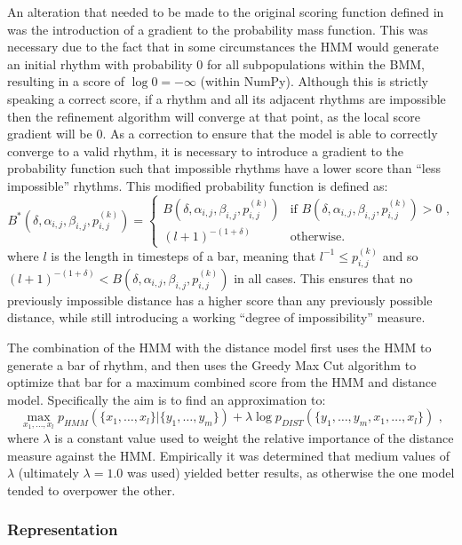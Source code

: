 \documentclass[ author={Stephen Livermore-Tozer},
				supervisor={Dr. Peter Flach},
				degree={MEng},
				title={Algorithmic Co-composition Using Machine Learning},
				subtitle={},
				type={research},
				year={2016} ]{dissertation}
\begin{document}
	An alteration that needed to be made to the original scoring function defined in \cite{paiement2007generative} was the introduction of a gradient to the probability mass function. This was necessary due to the fact that in some circumstances the HMM would generate an initial rhythm with probability $0$ for all subpopulations within the BMM, resulting in a score of $\log 0 = -\infty$ (within NumPy). Although this is strictly speaking a correct score, if a rhythm and all its adjacent rhythms are impossible then the refinement algorithm will converge at that point, as the local score gradient will be $0$. As a correction to ensure that the model is able to correctly converge to a valid rhythm, it is necessary to introduce a gradient to the probability function such that impossible rhythms have a lower score than ``less impossible'' rhythms. This modified probability function is defined as:
	$$B^*(\delta,\alpha_{i,j},\beta_{i,j},p_{i,j}^{(k)}) =
	\begin{cases}
		B(\delta,\alpha_{i,j},\beta_{i,j},p_{i,j}^{(k)}) & \text{if } B(\delta,\alpha_{i,j},\beta_{i,j},p_{i,j}^{(k)}) > 0 \text{ ,} \\
		(l+1)^{-(1 + \delta)} & \text{otherwise.}
	\end{cases}$$
	where $l$ is the length in timesteps of a bar, meaning that $l^{-1} \leq p_{i,j}^{(k)}$ and so $(l+1)^{-(1 + \delta)} < B(\delta,\alpha_{i,j},\beta_{i,j},p_{i,j}^{(k)})$ in all cases. This ensures that no previously impossible distance has a higher score than any previously possible distance, while still introducing a working ``degree of impossibility'' measure. 
	
	The combination of the HMM with the distance model first uses the HMM to generate a bar of rhythm, and then uses the Greedy Max Cut algorithm \cite{rohde2002methods} to optimize that bar for a maximum combined score from the HMM and distance model. Specifically the aim is to find an approximation to:
	$$ \max_{x_1,\dots,x_l} p_{HMM}(\{x_1,\dots,x_l\} | \{y_1,\dots,y_m\}) + \lambda \log p_{DIST}(\{y_1,\dots,y_m,x_1,\dots,x_l\}) \text{ ,} $$
	where $\lambda$ is a constant value used to weight the relative importance of the distance measure against the HMM. Empirically it was determined that medium values of $\lambda$ (ultimately $\lambda = 1.0$ was used) yielded better results, as otherwise the one model tended to overpower the other.
	
	\subsubsection{Representation}
	
\end{document}
